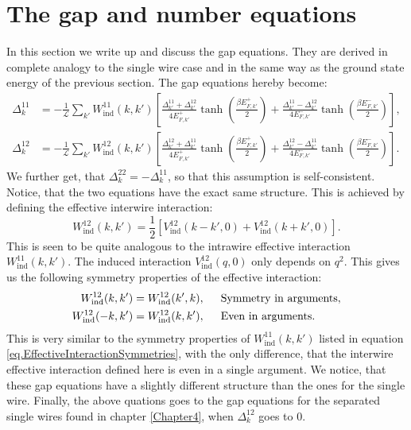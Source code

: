 \section{The gap and number equations}
\label{sec.2wiresgapandnumberequations}
In this section we write up and discuss the gap equations. They are derived in complete analogy to the single wire case and in the same way as the ground state energy of the previous section. The gap equations hereby become:
\begin{align}
\Delta^{11}_k &= -\frac{1}{\mathcal{L}}\sum_{k'} W_{\text{ind}}^{11}(k, k')\left[\frac{\Delta^{11}_{k'} + \Delta^{12}_{k'}}{4E^{+}_{F,k'}}\tanh\left(\frac{\beta E^{+}_{F,k'}}{2}\right) + \frac{\Delta^{11}_{k'} - \Delta^{12}_{k'}}{4E^{-}_{F,k'}}\tanh\left(\frac{\beta E^{-}_{F,k'}}{2}\right)\right], \nonumber \\
\Delta^{12}_k &= -\frac{1}{\mathcal{L}}\sum_{k'} W_{\text{ind}}^{12}(k, k')\left[\frac{\Delta^{12}_{k'} + \Delta^{11}_{k'}}{4E^{+}_{F,k'}}\tanh\left(\frac{\beta E^{+}_{F,k'}}{2}\right) + \frac{\Delta^{12}_{k'} - \Delta^{11}_{k'}}{4E^{-}_{F,k'}}\tanh\left(\frac{\beta E^{-}_{F,k'}}{2}\right)\right].
\label{eq.2wiresgapequations}
\end{align}
We further get, that $\Delta^{22}_k = - \Delta^{11}_k$, so that this assumption is self-consistent. Notice, that the two equations have the exact same structure. This is achieved by defining the effective interwire interaction: 
\begin{equation}
W_{\text{ind}}^{12}(k, k') = \frac{1}{2}\left[V_{\text{ind}}^{12}(k - k', 0) + V_{\text{ind}}^{12}(k + k', 0) \right].
\end{equation}
This is seen to be quite analogous to the intrawire effective interaction $W_{\text{ind}}^{11}(k, k')$. The induced interaction $V_{\text{ind}}^{12}(q, 0)$ only depends on $q^2$. This gives us the following symmetry properties of the effective interaction:
\begin{align}
W_{\text{ind}}^{12}(k,k')   &= W_{\text{ind}}^{12}(k',k), \hspace{0.5cm} \text{Symmetry in arguments}, \nonumber \\
W_{\text{ind}}^{12}(-k,k')  &= W_{\text{ind}}^{12}(k,k'), \hspace{0.5cm} \text{Even in arguments}.
\label{eq.EffectiveInterwireInteractionSymmetries}
\end{align}
This is very similar to the symmetry properties of $W_{\text{ind}}^{11}(k, k')$ listed in equation \ref{eq.EffectiveInteractionSymmetries}, with the only difference, that the interwire effective interaction defined here is even in a single argument. We notice, that these gap equations have a slightly different structure than the ones for the single wire. Finally, the above quations goes to the gap equations for the separated single wires found in chapter \ref{Chapter4}, when $\Delta^{12}_k$ goes to $0$.  	


